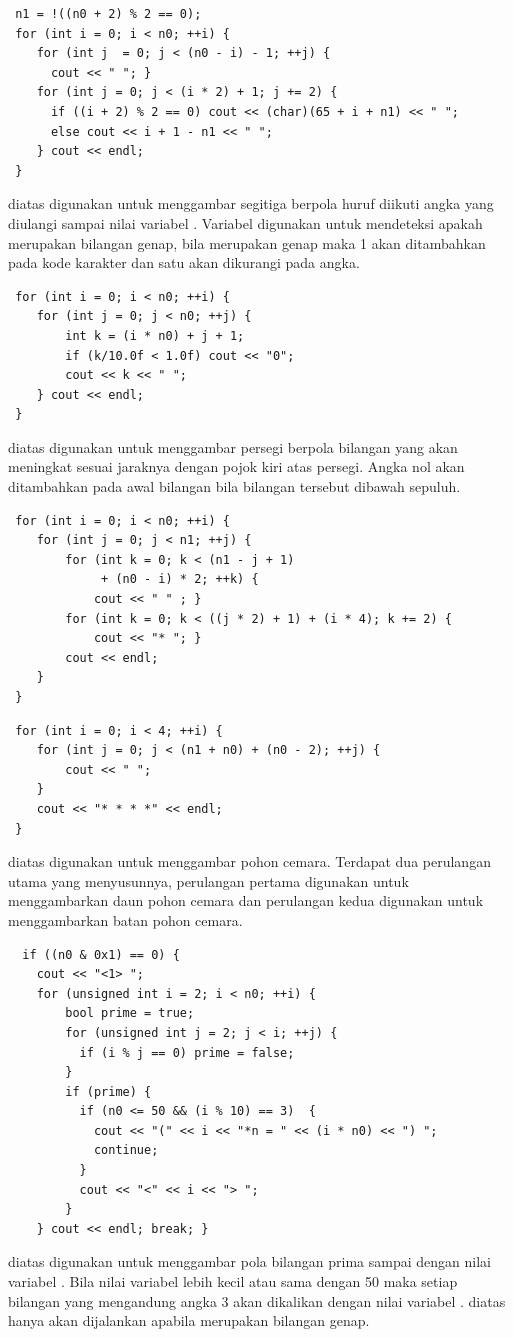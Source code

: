 \documentclass[../main.tex]{subfiles}
\begin{document}
\begin{lstlisting}
 n1 = !((n0 + 2) % 2 == 0);
 for (int i = 0; i < n0; ++i) {
 	for (int j  = 0; j < (n0 - i) - 1; ++j) {
 	  cout << " "; }
 	for (int j = 0; j < (i * 2) + 1; j += 2) {
 	  if ((i + 2) % 2 == 0) cout << (char)(65 + i + n1) << " ";
 	  else cout << i + 1 - n1 << " ";
 	} cout << endl;
 }
\end{lstlisting}
    \ilz{}{\Script} diatas digunakan untuk menggambar segitiga berpola huruf diikuti angka yang diulangi sampai nilai variabel . Variabel  digunakan untuk mendeteksi apakah  merupakan bilangan genap, bila  merupakan genap maka 1 akan ditambahkan pada kode karakter dan satu akan dikurangi pada angka.

\begin{lstlisting}
 for (int i = 0; i < n0; ++i) {
 	for (int j = 0; j < n0; ++j) {
 		int k = (i * n0) + j + 1;
 		if (k/10.0f < 1.0f) cout << "0";
 		cout << k << " ";
 	} cout << endl;
 }
\end{lstlisting}
    \ilz{}{\Script} diatas digunakan untuk menggambar persegi berpola bilangan yang akan meningkat sesuai jaraknya dengan pojok kiri atas persegi. Angka nol akan ditambahkan pada awal bilangan bila bilangan tersebut dibawah sepuluh.

\begin{lstlisting}
 for (int i = 0; i < n0; ++i) {
 	for (int j = 0; j < n1; ++j) {
 		for (int k = 0; k < (n1 - j + 1)
 			 + (n0 - i) * 2; ++k) {
 			cout << " "	; }
 		for (int k = 0; k < ((j * 2) + 1) + (i * 4); k += 2) {
 			cout << "* "; }
 		cout << endl;
 	}
 }
\end{lstlisting}
\begin{lstlisting}
 for (int i = 0; i < 4; ++i) {
 	for (int j = 0; j < (n1 + n0) + (n0 - 2); ++j) {
 		cout << " ";
 	}
 	cout << "* * * *" << endl;
 }
\end{lstlisting}
    \ilz{}{\Script} diatas digunakan untuk menggambar pohon cemara. Terdapat dua perulangan utama yang menyusunnya, perulangan pertama digunakan untuk menggambarkan daun pohon cemara dan perulangan kedua digunakan untuk menggambarkan batan pohon cemara.

\begin{lstlisting}
  if ((n0 & 0x1) == 0) {
    cout << "<1> ";
    for (unsigned int i = 2; i < n0; ++i) {
    	bool prime = true;
    	for (unsigned int j = 2; j < i; ++j) {
    	  if (i % j == 0) prime = false;
    	}
    	if (prime) {
    	  if (n0 <= 50 && (i % 10) == 3)  {
    	  	cout << "(" << i << "*n = " << (i * n0) << ") ";
    	  	continue;
    	  }
    	  cout << "<" << i << "> ";
    	}
    } cout << endl; break; }
\end{lstlisting}
    \vspace{-0.15ex}
    \ilz{}{\Script} diatas digunakan untuk menggambar pola bilangan prima sampai dengan nilai variabel . Bila nilai variabel  lebih kecil atau sama dengan 50 maka setiap bilangan yang mengandung angka 3 akan dikalikan dengan nilai variabel . {\Script} diatas hanya akan dijalankan apabila  merupakan bilangan genap.
\end{document}
